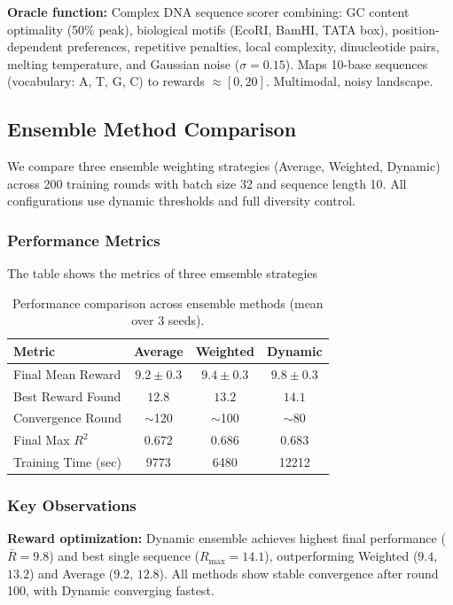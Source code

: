 \documentclass[conference]{IEEEtran}
\begin{document}
\textbf{Oracle function:} Complex DNA sequence scorer combining: GC content optimality (50\% peak), biological motifs (EcoRI, BamHI, TATA box), position-dependent preferences, repetitive penalties, local complexity, dinucleotide pairs, melting temperature, and Gaussian noise ($\sigma=0.15$). Maps 10-base sequences (vocabulary: A, T, G, C) to rewards $\approx [0,20]$. Multimodal, noisy landscape.








\subsection{Ensemble Method Comparison}

We compare three ensemble weighting strategies (Average, Weighted, Dynamic) across 200 training rounds with batch size 32 and sequence length 10. All configurations use dynamic thresholds and full diversity control.
  
\subsubsection{Performance Metrics}
The table shows the metrics of three emsemble strategies
\begin{table}[htbp]
\centering
\begin{tabular}{lccc}
\hline
\textbf{Metric} & \textbf{Average} & \textbf{Weighted} & \textbf{Dynamic} \\
\hline
Final Mean Reward & $9.2 \pm 0.3$ & $9.4 \pm 0.3$ & $9.8 \pm 0.3$ \\
Best Reward Found & $12.8$ & $13.2$ & $14.1$ \\
Convergence Round & $\sim$120 & $\sim$100 & $\sim$80 \\
Final Max $R^2$ & $0.672$ & $0.686$ & $0.683$ \\
Training Time (sec) & 9773 & 6480 & 12212 \\
\hline
\end{tabular}
\caption{Performance comparison across ensemble methods (mean over 3 seeds).}
\end{table}

\subsubsection{Key Observations}

\textbf{Reward optimization:} Dynamic ensemble achieves highest final performance ($\bar{R} = 9.8$) and best single sequence ($R_{\max} = 14.1$), outperforming Weighted ($9.4$, $13.2$) and Average ($9.2$, $12.8$). All methods show stable convergence after round 100, with Dynamic converging fastest.
\end{document}
